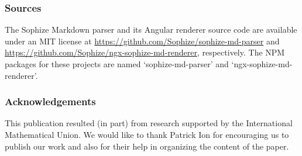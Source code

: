 \documentclass[a4paper]{article}
\begin{document}
\subsubsection*{Sources}
The Sophize Markdown parser and its Angular renderer source code are available under an MIT license at \url{https://github.com/Sophize/sophize-md-parser} and \url{https://github.com/Sophize/ngx-sophize-md-renderer}, respectively. The NPM packages for these projects are named `sophize-md-parser' and `ngx-sophize-md-renderer'.

\subsubsection*{Acknowledgements}
This publication resulted (in part) from research supported by the International Mathematical Union. We would like to thank Patrick Ion for encouraging us to publish our work and also for their help in organizing the content of the paper.

 








\end{document}
